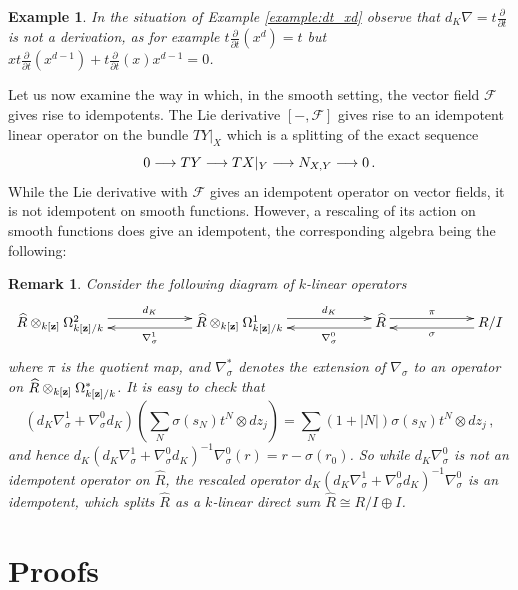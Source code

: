 \documentclass[english,letter paper,12pt,leqno]{article}
\theoremstyle{example}
\newtheorem{example}[theorem]{Example}
\newtheorem{remark}[theorem]{Remark}
\numberwithin{equation}{section}
\begin{document}
\begin{example}\label{example:dt_xd2} In the situation of Example \ref{example:dt_xd} observe that $d_K \nabla = t \frac{\partial}{\partial t}$ is \emph{not} a derivation, as for example $t\frac{\partial}{\partial t}( x^d ) = t$ but $x t \frac{\partial}{\partial t}(x^{d-1}) + t \frac{\partial}{\partial t}(x) x^{d-1} = 0$.
\end{example}

Let us now examine the way in which, in the smooth setting, the vector field $\mathscr{F}$ gives rise to idempotents. The Lie derivative $[-, \mathscr{F}]$ gives rise to an idempotent linear operator on the bundle $TY|_X$ which is a splitting of the exact sequence 
\[
0 \longrightarrow TY \longrightarrow TX|_Y \longrightarrow N_{X,Y} \longrightarrow 0\,.
\]
While the Lie derivative with $\mathscr{F}$ gives an idempotent operator on vector fields, it is not idempotent on smooth functions. However, a rescaling of its action on smooth functions does give an idempotent, the corresponding algebra being the following:

\begin{remark} Consider the following diagram of $k$-linear operators
\[
\xymatrix@C+3pc@R+2pc{
\widehat{R} \otimes_{k[\bold{z}]} \Omega^2_{k[\bold{z}]/k} \ar@<0.8ex>[r]^-{d_K} &
\widehat{R} \otimes_{k[\bold{z}]} \Omega^1_{k[\bold{z}]/k} \ar@<0.8ex>[l]^-{\nabla^1_\sigma}\ar@<0.8ex>[r]^-{d_K} & \widehat{R} \ar@<0.8ex>[l]^-{\nabla^0_\sigma} \ar@<0.8ex>[r]^-{\pi} & R/I \ar@<0.8ex>[l]^-{\sigma}
}
\]
where $\pi$ is the quotient map, and $\nabla^*_\sigma$ denotes the extension of $\nabla_\sigma$ to an operator on $\widehat{R} \otimes_{k[\bold{z}]} \Omega^*_{k[\bold{z}]/k}$. It is easy to check that
\[
\left( d_K \nabla^1_\sigma + \nabla^0_\sigma d_K \right)\left( \sum_N \sigma(s_N)t^N \otimes dz_j \right) = \sum_N (1 + |N|) \sigma(s_N) t^N \otimes dz_j\,,
\]
and hence $d_K \left( d_K \nabla^1_\sigma + \nabla^0_\sigma d_K \right)^{-1} \nabla^0_\sigma(r) = r - \sigma(r_0)$. So while $d_K \nabla^0_\sigma$ is not an idempotent operator on $\widehat{R}$, the rescaled operator $d_K \left( d_K \nabla^1_\sigma + \nabla^0_\sigma d_K \right)^{-1} \nabla^0_\sigma$ is an idempotent, which splits $\widehat{R}$ as a $k$-linear direct sum $\widehat{R} \cong R/I \oplus I$.
\end{remark}

\section{Proofs}\label{section:proofs}
\end{document}
